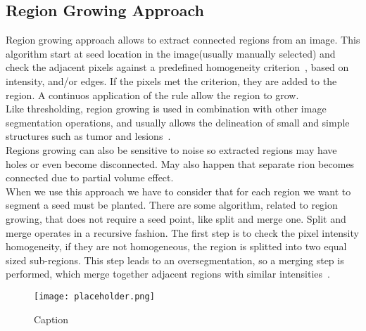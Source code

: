 \documentclass{standalone}
\begin{document}
\subsection{Region Growing Approach}

Region growing approach allows to extract connected regions from an image. This algorithm start at seed location in the image(usually manually selected) and check the adjacent pixels against a predefined homogeneity criterion~\cite{INP:Withey}, based on intensity, and/or edges.   If the pixels met the criterion, they are added to the region. A continuos application of the rule allow the region to grow. \\
Like thresholding, region growing is used in combination with other image segmentation operations, and usually allows the delineation of small and simple structures such as tumor and lesions~\cite{ART:Pham}.\\
Regions growing can also be sensitive to noise so extracted regions may have holes or even become disconnected. May also happen that separate rion becomes connected due to partial volume effect. \\
When we use this approach we have to consider that for each region we want to segment a seed must be planted. There are some algorithm, related to region growing, that does not require a seed point, like split and merge one. Split and merge operates in a recursive fashion. The first step is to check the pixel intensity homogeneity, if they are not homogeneous, the region is splitted into two equal sized sub-regions. This step leads to an oversegmentation, so a merging step is performed, which merge together adjacent regions with similar intensities~\cite{INP:Withey}. 

\begin{figure}[hp]
\label{fig:RegionGrowing}
	\centering
		\texttt{[image: placeholder.png]}
	\caption{Caption}
\end{figure}
\end{document}
